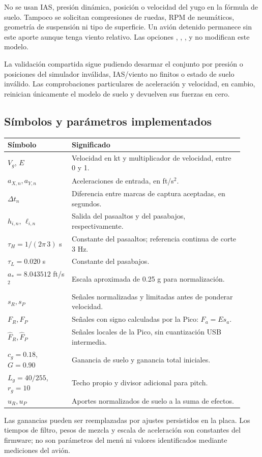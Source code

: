 No se usan IAS, presión dinámica, posición o velocidad del yugo en la fórmula de suelo. Tampoco se solicitan compresiones de ruedas, RPM de neumáticos, geometría de suspensión ni tipo de superficie. Un avión detenido permanece sin este aporte aunque tenga viento relativo. Las opciones , , ,  y  no modifican este modelo.

La validación compartida sigue pudiendo desarmar el conjunto por presión o posiciones del simulador inválidas, IAS/viento no finitos o estado de suelo inválido. Las comprobaciones particulares de aceleración y velocidad, en cambio, reinician únicamente el modelo de suelo y devuelven sus fuerzas en cero.

\subsection{Símbolos y parámetros implementados}
\begin{longtable}{p{0.25\linewidth}p{0.67\linewidth}}
\toprule Símbolo & Significado\\\midrule\endhead
$V_g$, $E$ & Velocidad en kt y multiplicador de velocidad, entre 0 y 1.\\
$a_{X,n},a_{Y,n}$ & Aceleraciones de entrada, en ft/s$^2$.\\
$\Delta t_n$ & Diferencia entre marcas de captura aceptadas, en segundos.\\
$h_{i,n}$, $\ell_{i,n}$ & Salida del pasaaltos y del pasabajos, respectivamente.\\
$\tau_H=1/(2\pi\,3)$ s & Constante del pasaaltos; referencia continua de corte 3 Hz.\\
$\tau_L=0.020$ s & Constante del pasabajos.\\
$a_*=8.043512$ ft/s$^2$ & Escala aproximada de 0.25 g para normalización.\\
$s_R,s_P$ & Señales normalizadas y limitadas antes de ponderar velocidad.\\
$F_R,F_P$ & Señales con signo calculadas por la Pico: $F_a=E s_a$.\\
$\widehat F_R,\widehat F_P$ & Señales locales de la Pico, sin cuantización USB intermedia.\\
$c_g=0.18$, $G=0.90$ & Ganancia de suelo y ganancia total iniciales.\\
$L_g=40/255$, $r_g=10$ & Techo propio y divisor adicional para pitch.\\
$u_R,u_P$ & Aportes normalizados de suelo a la suma de efectos.\\
\bottomrule
\end{longtable}
Las ganancias pueden ser reemplazadas por ajustes persistidos en la placa. Los tiempos de filtro, pesos de mezcla y escala de aceleración son constantes del firmware; no son parámetros del menú ni valores identificados mediante mediciones del avión.


